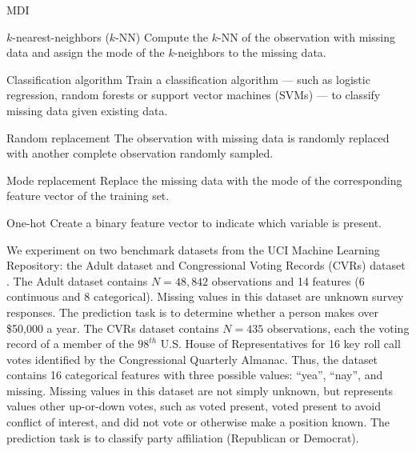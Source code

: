 \documentclass[10pt]{book}
\theoremstyle{definition}
\begin{document}
\begin{labeling}{MDI}

\item[$k$-nearest-neighbors ($k$-NN)]
Compute the $k$-NN of the observation with missing data and assign the mode of the $k$-neighbors to the missing data.

\item[Classification algorithm]
Train a classification algorithm --- such as logistic regression, random forests or support vector machines (SVMs) --- to classify missing data given existing data. 


\item[Random replacement] 
    The observation with missing data is randomly replaced with another complete observation randomly sampled.

\item[Mode replacement]
Replace the missing data with the mode of the corresponding feature vector of the training set.

\item[One-hot] Create a binary feature vector to indicate which variable is present.

\end{labeling}

\par


\setcounter{chapter}{3}
\setcounter{equation}{0} %


We experiment on two benchmark datasets from the UCI Machine Learning Repository: the Adult dataset and Congressional Voting Records (CVRs) dataset \citep{Lichman2013}. The Adult dataset contains $N=48,842$ observations and 14 features (6 continuous and 8 categorical). Missing values in this dataset are unknown survey responses. The prediction task is to determine whether a person makes over \$50,000 a year. The CVRs dataset contains $N=435$ observations, each the voting record of a member of the $98^{th}$ U.S. House of Representatives for 16 key roll call votes identified by the Congressional Quarterly Almanac. Thus, the dataset contains 16 categorical features with three possible values: ``yea'', ``nay'', and missing. Missing values in this dataset are not simply unknown, but represents values other up-or-down votes, such as voted present, voted present to avoid conflict of interest, and did not vote or otherwise make a position known. The prediction task is to classify party affiliation (Republican or Democrat). 
\end{document}
